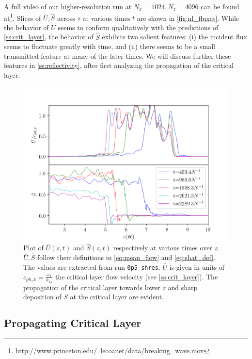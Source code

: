 \documentclass[
        fleqn,
        usenatbib,
    ]{mnras}
\begin{document}
A full video of our higher-resolution run at $N_x = 1024, N_z = 4096$ can be
found at\footnote{ http://www.princeton.edu/~lecoanet/data/breaking\_wave.mov}.
Slices of $\bar{U}, \hat{S}$ across $z$ at various times $t$ are shown in
\autoref{fig:nl_fluxes}. While the behavior of $\bar{U}$ seems to conform
qualitatively with the predictions of \autoref{ss:crit_layer}, the behavior of
$\hat{S}$ exhibits two salient features: (i) the incident flux seems to fluctuate
greatly with time, and (ii) there seems to be a small transmitted feature at many
of the later times. We will discuss further these features in
\autoref{ss:reflectivity}, after first analyzing the propagation of the critical
layer.
\begin{figure}[t]
    \centering
    \includegraphics[width=\columnwidth]{plots/nl_fluxes.png}
    \caption{Plot of $\bar{U}(z, t)$ and $\hat{S}(z, t)$ respectively at various
    times over $z$. $\bar{U}, \hat{S}$ follow their definitions in
    \autoref{eq:mean_flow} and \autoref{eq:shat_def}. The values are extracted
    from run \texttt{0p5\_shres}. $\bar{U}$ is given
    in units of $c_{ph, x} = \frac{\omega_1}{k_{1x}}$ the critical layer flow
    velocity (see \autoref{ss:crit_layer}). The propagation of the critical
    layer towards lower $z$ and sharp deposition of $S$ at the critical layer
    are evident.}\label{fig:nl_fluxes}
\end{figure}

\subsection{Propagating Critical Layer}
\end{document}
